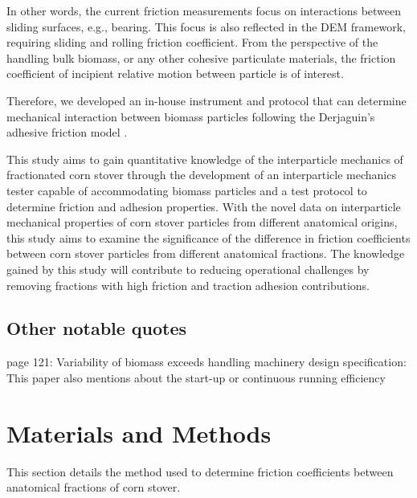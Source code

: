 \documentclass[xcolor=dvipsnames,10pt,hidelinks]{article}
\let\oldsubsection\subsection
\renewcommand{\subsection}{\clearpage\oldsubsection}
\begin{document}
In other words, the current friction measurements focus on interactions between sliding surfaces, e.g., bearing.
This focus is also reflected in the DEM framework, requiring sliding and rolling friction coefficient.
From the perspective of the handling bulk biomass, or any other cohesive particulate materials, the friction coefficient of incipient relative motion between particle is of interest.

Therefore, we developed an in-house instrument and protocol that can determine mechanical interaction between biomass particles following the Derjaguin's adhesive friction model \citep{gao_frictional_2004,derjaguin1934molekulartheorie,derjaguin_effect_1975}.

This study aims to gain quantitative knowledge of the interparticle mechanics of fractionated corn stover through the development of an interparticle mechanics tester capable of accommodating biomass particles and a test protocol to determine friction and adhesion properties.
With the novel data on interparticle mechanical properties of corn stover particles from different anatomical origins, this study aims to examine the significance of the difference in friction coefficients between corn stover particles from different anatomical fractions.
The knowledge gained by this study will contribute to reducing operational challenges by removing fractions with high friction and traction adhesion contributions.
\subsection{Other notable quotes}
\label{sec:org7f97faf}
 page 121: Variability of biomass exceeds handling machinery design specification: This paper also mentions about the start-up or continuous running efficiency
\section{Materials and Methods}
\label{sec:org5d422b6}
This section details the method used to determine friction coefficients between anatomical fractions of corn stover.
\end{document}
